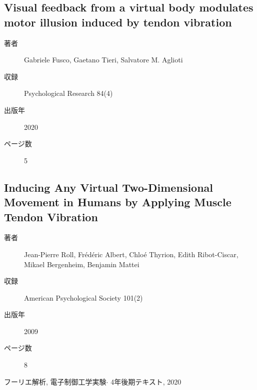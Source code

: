 \documentclass[]{jsarticle}
\begin{document}
    \subsection{Visual feedback from a virtual body modulates motor illusion induced by tendon vibration}
        \begin{description}
            \item[著者] Gabriele Fusco, Gaetano Tieri, Salvatore M. Aglioti
            \item[収録] Psychological Research 84(4)
            \item[出版年] 2020
            \item[ページ数] 5
        \end{description}

    \subsection{Inducing Any Virtual Two-Dimensional Movement in Humans by Applying Muscle Tendon Vibration}
        \begin{description}
            \item[著者] Jean-Pierre Roll, Frédéric Albert, Chloé Thyrion, Edith Ribot-Ciscar, Mikael Bergenheim, Benjamin Mattei
            \item[収録] American Psychological Society 101(2)
            \item[出版年] 2009
            \item[ページ数] 8
        \end{description}

\begin{thebibliography}{99}
     フーリエ解析, 電子制御工学実験$\cdot$ 4年後期テキスト, 2020
\end{thebibliography}
\end{document}

